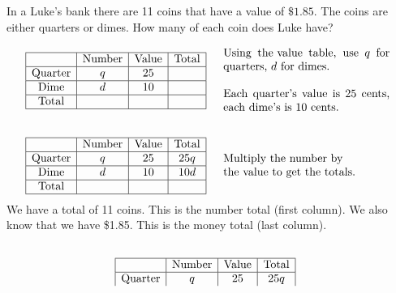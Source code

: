 \begin{example}
  In a Luke's bank there are 11 coins that have a value of $\$1.85$. The coins are either quarters or dimes. How many of each coin does Luke have?


  \begin{eqnarray*}
    \begin{array}{|c|c|c|c|}
      \hline
      & \tmop{Number} & \tmop{Value} & \tmop{Total}\\
      \hline
      \tmop{Quarter} & q & 25 & \\
      \hline
      \tmop{Dime} & d & 10 & \\
      \hline
      \tmop{Total} &  &  & \\
      \hline
    \end{array} &  & \begin{array}{p{0.425\textwidth}}
      \tmop{Using} \tmop{the~value} \tmop{table}, \tmop{use} $q$ \tmop{for}
      \tmop{quarters}, $d$ \tmop{for} \tmop{dimes}.\pp
      \tmop{Each} \tmop{quarter's} \tmop{value} \tmop{is} 25 \tmop{cents},
      \tmop{each~dime's} \tmop{is} 10 \tmop{cents}.
    \end{array}\\
    &  & \\
    \begin{array}{|c|c|c|c|}
      \hline
      & \tmop{Number} & \tmop{Value} & \tmop{Total}\\
      \hline
      \tmop{Quarter} & q & 25 & 25 q\\
      \hline
      \tmop{Dime} & d & 10 & 10 d\\
      \hline
      \tmop{Total} &  &  & \\
      \hline
    \end{array} &  & \begin{array}{p{0.425\textwidth}}
		\text{Multiply~the~number~by} \text{the~value} \text{to~get} \text{the~totals}.
		\end{array}
  \end{eqnarray*}
We have a total of 11 coins.  This is the number total (first column).  We also know that we have \$1.85.  This is the money total (last column).
 \begin{eqnarray*}
   &  & \\
    \begin{array}{|c|c|c|c|}
      \hline
      & \operatorname{Number} & \operatorname{Value} & \operatorname{Total}\\
      \hline
      \operatorname{Quarter} & q & 25 & 25 q\\

\end{array}
\end{eqnarray*}
\end{example}
